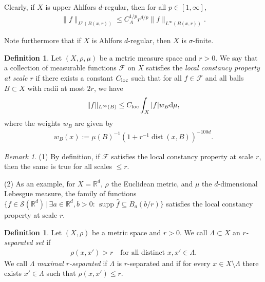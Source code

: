 \documentclass[12pt,reqno]{amsart}
\theoremstyle{definition}
\newtheorem{definition}[theorem]{Definition}
\theoremstyle{remark}
\newtheorem{remark}[theorem]{Remark}
\numberwithin{equation}{section}
\newcommand{\1}{\mathbbm{1}}
\newcommand{\R}{\mathbb{R}}
\DeclareMathOperator{\dist}{dist}
\DeclareMathOperator{\supp}{supp}
\def\rd{\mathrm{d}}
\begin{document}
Clearly, if $X$ is upper Ahlfors $d$-regular, then for all $p\in [1,\infty]$,
\begin{align}\label{eq: abstract Hoelder}
  \|f\|_{L^{p}(B(x,r))}\leq C_A^{1/p}r^{d/p}\|f\|_{L^{\infty}(B(x,r))}.    
\end{align}

Note furthermore that if $X$ is Ahlfors $d$-regular, then $X$ is $\sigma$-finite.



\begin{definition}
Let $(X,\rho,\mu)$ be a metric measure space and $r>0$.
We say that a collection of measurable functions $\mathcal{F}$ on $X$ satisfies the \emph{local constancy property at scale $r$} if there exists a constant $C_{\rm loc}$ such that for all $f\in\mathcal{F}$ and all balls $B\subset X$ with radii at most $2r$, we have 
\begin{align}\label{eq. local constancy property}
 \|f\|_{L^{\infty}(B)}\leq C_{\rm loc}\int_{X}|f|w_B\rd\mu,
\end{align}
where the weights $w_B$ are given by
\begin{align*}
    w_B(x):=\mu(B)^{-1}(1+r^{-1}\dist(x,B))^{-100d}.
\end{align*}
\end{definition}

\begin{remark}\label{rem:locallyconstant}
  (1) By definition, if $\mathcal{F}$ satisfies the local constancy property at scale $r$, then the same is true for all scales $\leq r$.

  \noindent
  (2) As an example, for $X=\R^d$, $\rho$ the Euclidean metric, and $\mu$ the $d$-dimensional Lebesgue measure, the family of functions $\{f\in \mathcal{S}(\R^d) \,|\, \exists a\in\R^d,b>0:\,\supp\hat f \subseteq B_a(b/r)\}$ satisfies the local constancy property at scale $r$.
\end{remark}

\begin{definition}
 Let $(X,\rho)$ be a metric space and $r>0$. We call $\Lambda\subset X$ an {\em $r$-separated set} if
\begin{align*}
    \rho(x,x')>r\quad\mbox{for all distinct }x,x'\in \Lambda.
\end{align*}
We call $\Lambda$ {\em maximal $r$-separated} if $\Lambda$ is $r$-separated and if for every $x\in X\setminus\Lambda$ there exists $x'\in\Lambda$ such that $\rho(x,x')\leq r$.
\end{definition}
\end{document}
